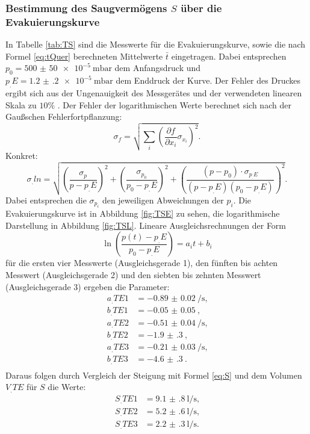 \subsubsection{Bestimmung des Saugvermögens $S$ über die Evakuierungskurve}

In Tabelle \ref{tab:TS} sind die Messwerte für die Evakuierungskurve, sowie die nach Formel \eqref{eq:tQuer} berechneten Mittelwerte $\bar{t}$ eingetragen.
Dabei entsprechen $p_0=\SI{500(50)e-5}{\milli\bar}$ dem Anfangsdruck und $p_.E=\SI{1.2(2)e-5}{\milli\bar}$ dem Enddruck der Kurve. Der Fehler des Druckes ergibt sich aus der Ungenauigkeit des Messgerätes und der verwendeten linearen Skala zu $10\%$ \cite{V70}. 
Der Fehler der logarithmischen Werte berechnet sich nach der Gaußschen Fehlerfortpflanzung:
\[
\sigma_f = \sqrt{\sum_i\left(\frac{\partial f}{\partial x_i}\sigma_{x_i}\right)^2}\text{.}
\]
Konkret:
\begin{equation}
\sigma_.{ln} = \sqrt{\left(\frac{\sigma_p}{p-p_.E}\right)^2+\left(\frac{\sigma_{p_0}}{p_0-p_.E}\right)^2+\left(\frac{(p-p_0)\cdot\sigma_{p_.E}}{(p-p_.E)(p_0-p_.E)}\right)^2}\text{.} \label{eq:ln}
\end{equation}
Dabei entsprechen die $\sigma_{p_i}$ den jeweiligen Abweichungen der $p_i$.
Die Evakuierungskurve ist in Abbildung \ref{fig:TSE} zu sehen, die logarithmische Darstellung in Abbildung \ref{fig:TSL}.
Lineare Ausgleichsrechnungen der Form
\[
\ln\left(\frac{p(t)-p_.E}{p_0-p_.E}\right) = a_it+b_i
\]
für die ersten vier Messwerte (Ausgleichsgerade 1), den fünften bis achten Messwert (Ausgleichsgerade 2) und den siebten bis zehnten Messwert (Ausgleichsgerade 3) ergeben die Parameter:
\begin{align*}
a_.{TE1} &= \SI{-0.89(2)}{\per\second} \text{,}\\
b_.{TE1} &= \SI{-0.05(5)}{} \text{,}\\
a_.{TE2} &= \SI{-0.51(4)}{\per\second} \text{,}\\
b_.{TE2} &= \SI{-1.9(3)}{} \text{,}\\
a_.{TE3} &= \SI{-0.21(3)}{\per\second} \text{,}\\
b_.{TE3} &= \SI{-4.6(3)}{} \text{.}\\
\end{align*} 
Daraus folgen durch Vergleich der Steigung mit Formel \eqref{eq:S} und dem Volumen $V_.{TE}$ für $S$ die Werte:
\begin{align*}
S_.{TE1} &= \SI{9.1(8)}{\litre\per\second} \text{,}\\
S_.{TE2} &= \SI{5.2(6)}{\litre\per\second} \text{,}\\
S_.{TE3} &= \SI{2.2(3)}{\litre\per\second} \text{.}\\
\end{align*} 

